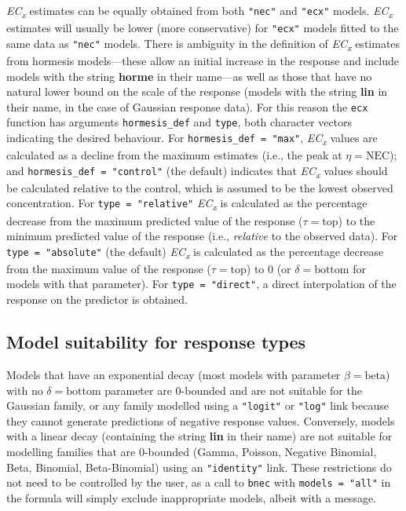 \documentclass[
  shortnames]{jss}
\begin{document}
\emph{EC\textsubscript{x}} estimates can be equally obtained from both \texttt{"nec"} and \texttt{"ecx"} models. \emph{EC\textsubscript{x}} estimates will usually be lower (more conservative) for \texttt{"ecx"} models fitted to the same data as \texttt{"nec"} models. There is ambiguity in the definition of \emph{EC\textsubscript{x}} estimates from hormesis models---these allow an initial increase in the response \citep[see][]{Mattson2008} and include models with the string \textbf{horme} in their name---as well as those that have no natural lower bound on the scale of the response (models with the string \textbf{lin} in their name, in the case of Gaussian response data). For this reason the \texttt{ecx} function has arguments \texttt{hormesis\_def} and \texttt{type}, both character vectors indicating the desired behaviour. For \texttt{hormesis\_def\ =\ "max"}, \emph{EC\textsubscript{x}} values are calculated as a decline from the maximum estimates (i.e., the peak at \(\eta = \text{NEC}\)); and \texttt{hormesis\_def\ =\ "control"} (the default) indicates that \emph{EC\textsubscript{x}} values should be calculated relative to the control, which is assumed to be the lowest observed concentration. For \texttt{type\ =\ "relative"} \emph{EC\textsubscript{x}} is calculated as the percentage decrease from the maximum predicted value of the response (\(\tau = \text{top}\)) to the minimum predicted value of the response (i.e., \emph{relative} to the observed data). For \texttt{type\ =\ "absolute"} (the default) \emph{EC\textsubscript{x}} is calculated as the percentage decrease from the maximum value of the response (\(\tau = \text{top}\)) to 0 (or \(\delta = \text{bottom}\) for models with that parameter). For \texttt{type\ =\ "direct"}, a direct interpolation of the response on the predictor is obtained.

\hypertarget{model-suitability-for-response-types}{%
\subsection{Model suitability for response types}\label{model-suitability-for-response-types}}

Models that have an exponential decay (most models with parameter \(\beta = \text{beta}\)) with no \(\delta = \text{bottom}\) parameter are 0-bounded and are not suitable for the Gaussian family, or any family modelled using a \texttt{"logit"} or \texttt{"log"} link because they cannot generate predictions of negative response values. Conversely, models with a linear decay (containing the string \textbf{lin} in their name) are not suitable for modelling families that are 0-bounded (Gamma, Poisson, Negative Binomial, Beta, Binomial, Beta-Binomial) using an \texttt{"identity"} link. These restrictions do not need to be controlled by the user, as a call to \texttt{bnec} with \texttt{models\ =\ "all"} in the formula will simply exclude inappropriate models, albeit with a message.
\end{document}
